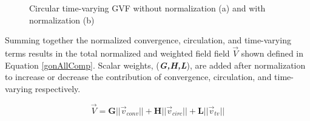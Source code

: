 \documentclass[numbered,pdftex]{ohio-etd}
\begin{document}
\begin{figure}[H]
	\begin{subfigmatrix}{2}%
		\centering	
		\hspace*{0mm}
	\end{subfigmatrix}
	\caption{Circular time-varying GVF without normalization (a) and with normalization (b)}
	\label{fig:gvfCircTimeVarying}
\end{figure}

Summing together the normalized convergence, circulation, and time-varying terms results in the total normalized and weighted field field $\vec{V}$ shown defined in Equation \ref{gonAllComp}. Scalar weights, (\textit{\textbf{G,H,L}}), are added after normalization to increase or decrease the contribution of convergence, circulation, and time-varying respectively. 

\begin{equation}
\vec{V} = \boldsymbol{G}||\vec{v}_{conv}|| + \boldsymbol{H}||\vec{v}_{circ}|| +  \boldsymbol{L}||\vec{v}_{tv}|| 
\label{gonAllComp}
\end{equation}
\end{document}
